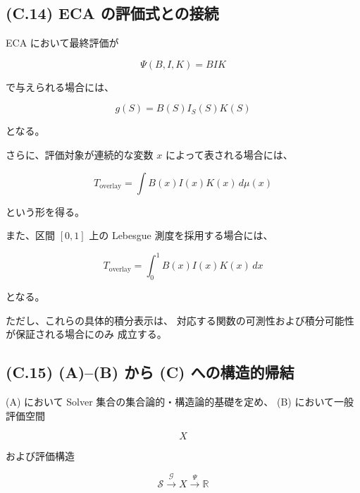 \documentclass[a4paper,11pt]{article}
\newcommand{\Solver}{\mathcal{S}}
\newcommand{\R}{\mathbb{R}}
\begin{document}
\subsection{(C.14) ECA の評価式との接続}
\label{subsec:C14}

ECA において最終評価が

\begin{equation}
    \Psi(B,I,K)
    =
    BIK
\end{equation}

で与えられる場合には、

\begin{equation}
    g(S)
    =
    B(S)I_S(S)K(S)
\end{equation}

となる。

さらに、評価対象が連続的な変数 $x$ によって表される場合には、

\begin{equation}
    \boxed{
        T_{\mathrm{overlay}}
        =
        \int
        B(x)I(x)K(x)
        \,d\mu(x)
    }
    \label{eq:C-overlay-integral}
\end{equation}

という形を得る。

また、区間 $[0,1]$ 上の Lebesgue 測度を採用する場合には、

\begin{equation}
    \boxed{
        T_{\mathrm{overlay}}
        =
        \int_0^1
        B(x)I(x)K(x)
        \,dx
    }
    \label{eq:C-lebesgue-integral}
\end{equation}

となる。

ただし、これらの具体的積分表示は、
対応する関数の可測性および積分可能性が保証される場合にのみ
成立する。


\subsection{(C.15) (A)--(B) から (C) への構造的帰結}
\label{subsec:C15}

(A) において Solver 集合の集合論的・構造論的基礎を定め、
(B) において一般評価空間

\begin{equation}
    X
\end{equation}

および評価構造

\begin{equation}
    \Solver
    \xrightarrow{\mathcal{G}}
    X
    \xrightarrow{\Psi}
    \R
\end{equation}
\end{document}
